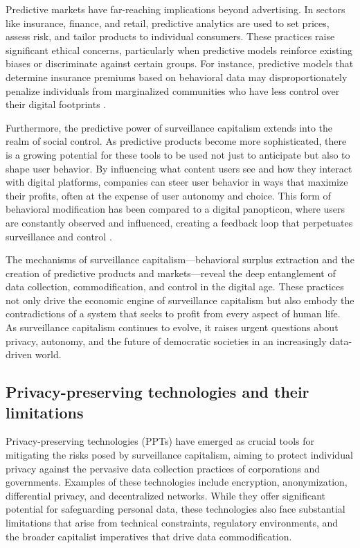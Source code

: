 \begin{refsection}
Predictive markets have far-reaching implications beyond advertising. In sectors like insurance, finance, and retail, predictive analytics are used to set prices, assess risk, and tailor products to individual consumers. These practices raise significant ethical concerns, particularly when predictive models reinforce existing biases or discriminate against certain groups. For instance, predictive models that determine insurance premiums based on behavioral data may disproportionately penalize individuals from marginalized communities who have less control over their digital footprints \cite[pp.~208-210]{eubanks2018automating}.

Furthermore, the predictive power of surveillance capitalism extends into the realm of social control. As predictive products become more sophisticated, there is a growing potential for these tools to be used not just to anticipate but also to shape user behavior. By influencing what content users see and how they interact with digital platforms, companies can steer user behavior in ways that maximize their profits, often at the expense of user autonomy and choice. This form of behavioral modification has been compared to a digital panopticon, where users are constantly observed and influenced, creating a feedback loop that perpetuates surveillance and control \cite[pp.~54-57]{zuboff2020age}.

The mechanisms of surveillance capitalism—behavioral surplus extraction and the creation of predictive products and markets—reveal the deep entanglement of data collection, commodification, and control in the digital age. These practices not only drive the economic engine of surveillance capitalism but also embody the contradictions of a system that seeks to profit from every aspect of human life. As surveillance capitalism continues to evolve, it raises urgent questions about privacy, autonomy, and the future of democratic societies in an increasingly data-driven world.

\subsection{Privacy-preserving technologies and their limitations}

Privacy-preserving technologies (PPTs) have emerged as crucial tools for mitigating the risks posed by surveillance capitalism, aiming to protect individual privacy against the pervasive data collection practices of corporations and governments. Examples of these technologies include encryption, anonymization, differential privacy, and decentralized networks. While they offer significant potential for safeguarding personal data, these technologies also face substantial limitations that arise from technical constraints, regulatory environments, and the broader capitalist imperatives that drive data commodification.


\end{refsection}
